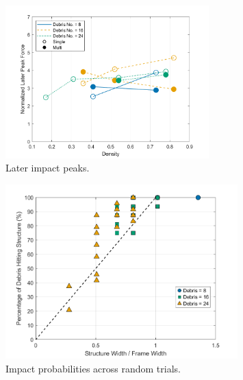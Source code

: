 \documentclass{article}
\begin{document}
\begin{figure}[htbp]
    \centering
    \includegraphics[width=0.7\textwidth]{Impact_LaterPeaks_densities_combined.png}
    \caption{Later impact peaks.}
    \label{fig:later_peaks_combined}
\end{figure}

\begin{figure}[htbp]
    \centering
    \includegraphics[width=0.8\textwidth]{Impact_probabilities.png}
    \caption{Impact probabilities across random trials.}
    \label{fig:impact_probabilities}
\end{figure}
\end{document}
